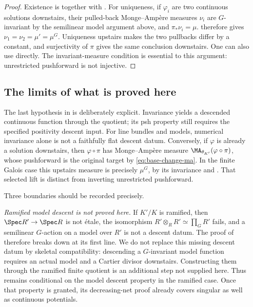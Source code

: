 \begin{proof}
Existence is  together with
.  For uniqueness, if $\varphi_i$ are two continuous solutions downstairs,
their pulled-back Monge--Amp\`ere measures $\nu_i$ are
$G$-invariant by the semilinear model argument above, and
$\pi_*\nu_i=\mu$.   therefore gives
$\nu_1=\nu_2=\mu'=\mu^G$.  Uniqueness upstairs makes the two pullbacks
differ by a constant, and surjectivity of $\pi$ gives the same conclusion
downstairs.  One can also use  directly.
The invariant-measure condition is essential to this argument:
unrestricted pushforward is not injective.
\end{proof}

\subsection{The limits of what is proved here}
\label{sec:ch30-descent-limits}

The last hypothesis in  is
deliberately explicit.  Invariance yields a descended continuous function through the quotient;
its psh property still requires the specified positivity descent input.
For line bundles and models, numerical invariance alone is not a
faithfully flat descent datum.  Conversely,
if $\varphi$ is already a solution downstairs, then
$\varphi\circ\pi$ has Monge--Amp\`ere measure
$\MA_{\theta_{K'}}(\varphi\circ\pi)$, whose pushforward is the original
target by \eqref{eq:base-change-ma}.  In the finite Galois case this upstairs measure is precisely $\mu^G$,
by its invariance and .  That
selected lift is distinct from inverting unrestricted pushforward.

Three boundaries should be recorded precisely.

\emph{Ramified model descent is not proved here.}  If $K'/K$ is
ramified, then $\Spec R'\to\Spec R$ is not étale, the isomorphism
$R'\otimes_RR'\simeq\prod_GR'$ fails, and a semilinear $G$-action on a
model over $R'$ is not a descent datum.  The proof of
 therefore breaks down at its first line.  We
do not replace this missing descent datum by skeletal compatibility:
descending a $G$-invariant model function requires an actual model and a
Cartier divisor downstairs.  Constructing them through the ramified finite
quotient is an additional step not supplied here.  Thus
 remains conditional on the model descent
property in the ramified case.  Once that property is granted, its
decreasing-net proof already covers singular as well as continuous
potentials.

